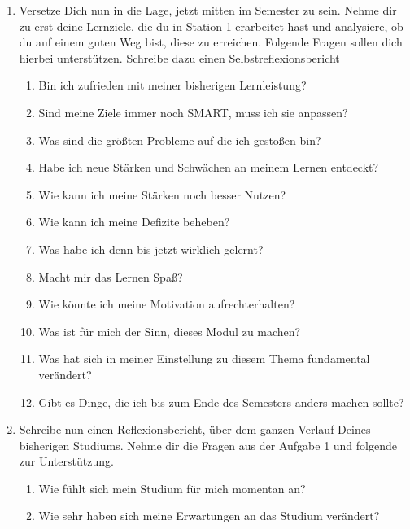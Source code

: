\documentclass[a4paper,oneside]{scrarticle}
\begin{document}
	\begin{enumerate}
		\item Versetze Dich nun in die Lage, jetzt mitten im Semester zu sein. Nehme dir zu erst deine Lernziele, die du in Station 1 erarbeitet hast und analysiere, ob du auf einem guten Weg bist, diese zu erreichen. Folgende Fragen sollen dich hierbei unterstützen. Schreibe dazu einen Selbstreflexionsbericht 
		\begin{enumerate}
			\item Bin ich zufrieden mit meiner bisherigen Lernleistung?
			\item Sind meine Ziele immer noch SMART, muss ich sie anpassen?
			\item Was sind die größten Probleme auf die ich gestoßen bin?
			\item Habe ich neue Stärken und Schwächen an meinem Lernen entdeckt?
			\item Wie kann ich meine Stärken noch besser Nutzen?
			\item Wie kann ich meine Defizite beheben?
			\item Was habe ich denn bis jetzt wirklich gelernt?
			\item Macht mir das Lernen Spaß?
			\item Wie könnte ich meine Motivation aufrechterhalten?
			\item Was ist für mich der Sinn, dieses Modul zu machen?
			\item Was hat sich in meiner Einstellung zu diesem Thema fundamental verändert?
			\item Gibt es Dinge, die ich bis zum Ende des Semesters anders machen sollte?
		\end{enumerate}
		\item Schreibe nun einen Reflexionsbericht, über dem ganzen Verlauf Deines bisherigen Studiums. Nehme dir die Fragen aus der Aufgabe 1 und folgende zur Unterstützung.
		\begin{enumerate}
			\item Wie fühlt sich mein Studium für mich momentan an?
			\item Wie sehr haben sich meine Erwartungen an das Studium verändert?
		\end{enumerate}

	\end{enumerate}
\end{document}
